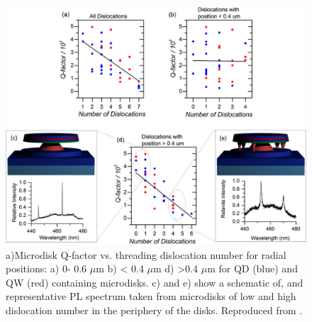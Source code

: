 \begin{figure}[h]
	\centering
	\includegraphics[width=1\textwidth]{Figs/Ch4/puchtlerdistance.png}
	\caption {a)Microdisk Q-factor vs. threading dislocation number for radial positions: a) 0- 0.6 $\mu$m b) < 0.4 $\mu$m d) >0.4 $\mu$m for QD (blue) and QW (red) containing microdisks. c) and e) show a schematic of, and representative PL spectrum taken from microdisks of low and high dislocation number in the periphery of the disks. Reproduced from \cite{Puchtler2015}.}
	\label{puchtlerdistance}
\end{figure}
\FloatBarrier 

